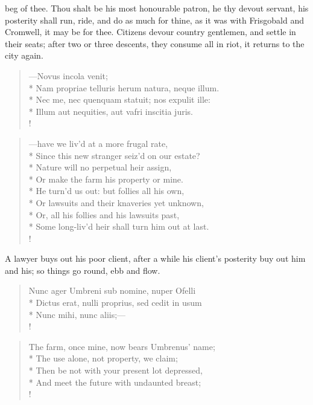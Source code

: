 {beg of thee. Thou shalt be his most honourable patron, he thy devout servant, his posterity shall run, ride, and do as much for thine, as it was with Frisgobald and Cromwell, it may be for thee. Citizens devour country gentlemen, and settle in their seats; after two or three descents, they consume all in riot, it returns to the city again.

\begin{latin}
\begin{verse}%
---Novus incola venit;\\*
Nam propriae telluris herum natura, neque illum.\\*
Nec me, nec quenquam statuit; nos expulit ille:\\*
Illum aut nequities, aut vafri inscitia juris.\\!
\end{verse}%
\end{latin}
\translationrule%
\begin{verse}%
---have we liv'd at a more frugal rate,\\*
Since this new stranger seiz'd on our estate?\\*
Nature will no perpetual heir assign,\\*
Or make the farm his property or mine.\\*
He turn'd us out: but follies all his own,\\*
Or lawsuits and their knaveries yet unknown,\\*
Or, all his follies and his lawsuits past,\\*
Some long-liv'd heir shall turn him out at last.\\!
\end{verse}%
%

A lawyer buys out his poor client, after a while his client's posterity buy out him and his; so things go round, ebb and flow.

\begin{latin}
\begin{verse}%
Nunc ager Umbreni sub nomine, nuper Ofelli\\*
Dictus erat, nulli proprius, sed cedit in usum\\*
Nunc mihi, nunc aliis;---\\!
\end{verse}%
\end{latin}
\translationrule%
\begin{verse}%
The farm, once mine, now bears Umbrenus' name;\\*
The use alone, not property, we claim;\\*
Then be not with your present lot depressed,\\*
And meet the future with undaunted breast;\\!
\end{verse}%

}
